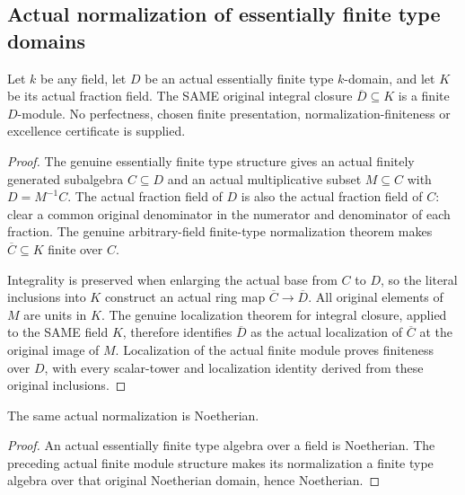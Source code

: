 \subsection{Actual normalization of essentially finite type domains}

\begin{theorem}
\label{algebra:actual-essentially-finite-type-normalization-finite}
\leanok
{}
Let $k$ be any field, let $D$ be an actual essentially finite type $k$-domain,
and let $K$ be its actual fraction field. The SAME original integral closure
$\overline D\subseteq K$ is a finite $D$-module. No perfectness, chosen finite
presentation, normalization-finiteness or excellence certificate is supplied.
\end{theorem}
\begin{proof}
The genuine essentially finite type structure gives an actual finitely generated
subalgebra $C\subseteq D$ and an actual multiplicative subset $M\subseteq C$
with $D=M^{-1}C$. The actual fraction field of $D$ is also the actual fraction
field of $C$: clear a common original denominator in the numerator and
denominator of each fraction. The genuine arbitrary-field finite-type
normalization theorem makes $\overline C\subseteq K$ finite over $C$.

Integrality is preserved when enlarging the actual base from $C$ to $D$, so the
literal inclusions into $K$ construct an actual ring map
$\overline C\longrightarrow\overline D$. All original elements of $M$ are units
in $K$. The genuine localization theorem for integral closure, applied to the
SAME field $K$, therefore identifies $\overline D$ as the actual localization
of $\overline C$ at the original image of $M$. Localization of the actual finite
module proves finiteness over $D$, with every scalar-tower and localization
identity derived from these original inclusions.
\end{proof}

\begin{corollary}
\label{algebra:actual-essentially-finite-type-normalization-noetherian}
\leanok
{}
The same actual normalization is Noetherian.
\end{corollary}
\begin{proof}
An actual essentially finite type algebra over a field is Noetherian.
The preceding actual finite module structure makes its normalization a finite
type algebra over that original Noetherian domain, hence Noetherian.
\end{proof}
